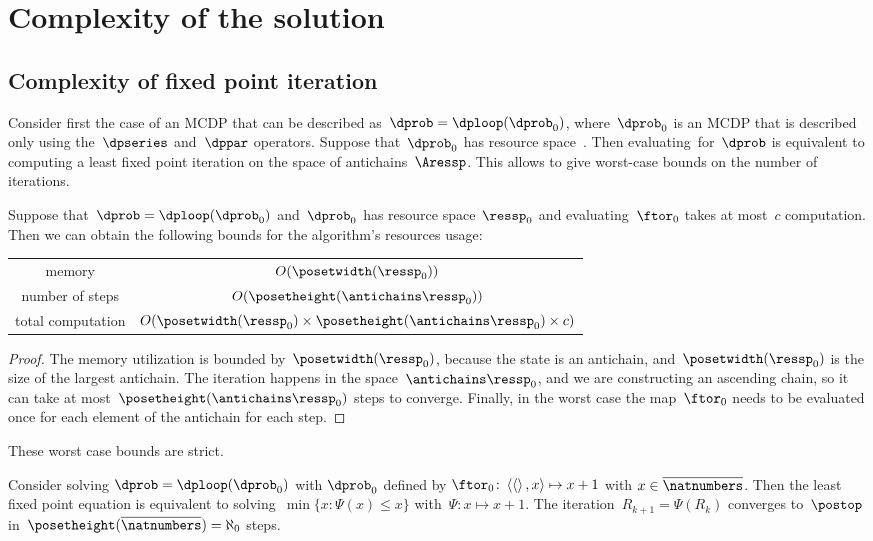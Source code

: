 

\section{Complexity of the solution}

\subsection{Complexity of fixed point iteration}

Consider first the case of an MCDP that can be described as~$\dprob=\dploop(\dprob_{0})$,
where~$\dprob_{0}$ is an MCDP that is described only using the~$\dpseries$
and~$\dppar$ operators. Suppose that~$\dprob_{0}$ has resource
space~\ressp. Then evaluating~\ftor for~$\dprob$ is equivalent
to computing a least fixed point iteration on the space of antichains~$\Aressp$.
This allows to give worst-case bounds on the number of iterations.

\begin{proposition}
  \label{prop:complexity}
  Suppose that~$\dprob=\dploop(\dprob_{0})$ and~$\dprob_{0}$ has resource space~$\ressp_{0}$ and evaluating~$\ftor_{0}$ takes at most~$c$ computation. Then we can obtain the following bounds for the algorithm's resources usage:

  \smallskip{}
  \begin{tabular}{cc}
    memory & $O(\posetwidth(\ressp_{0}))$\tabularnewline
    number of steps & $O(\posetheight(\antichains\ressp_{0}))$\tabularnewline
    total computation & $O(\posetwidth(\ressp_{0})\times\posetheight(\antichains\ressp_{0})\times c)$\tabularnewline
  \end{tabular}

\end{proposition}
\begin{proof}
  The memory utilization is bounded by~$\posetwidth(\ressp_{0})$, because the state is an antichain, and~$\posetwidth(\ressp_{0})$ is the size of the largest antichain. The iteration happens in the space~$\antichains\ressp_{0}$, and we are constructing an ascending chain, so it can take at most~$\posetheight(\antichains\ressp_{0})$ steps to converge. Finally, in the worst case the map~$\ftor_{0}$ needs to be evaluated once for each element of the antichain for each step.
\end{proof}
These worst case bounds are strict.
\begin{example}
  Consider solving $\dprob=\dploop(\dprob_{0})$ with $\dprob_{0}$
  defined by $\ftor_{0}\colon\left\langle \left\langle \right\rangle ,x\right\rangle \mapsto x+1$
  with $x\in\overline{\natnumbers}$. Then the least fixed point equation
  is equivalent to solving~$\min\{x\colon\Psi(x)\leq x\}$ with~$\Psi:x\mapsto x+1$.
  The iteration~$R_{k+1}=\Psi(R_{k})$ converges to~$\postop$ in~$\posetheight(\overline{\natnumbers})=\aleph_{0}$
  steps.
\end{example}

